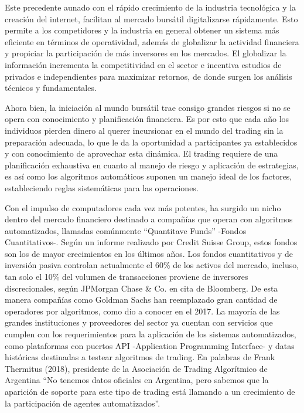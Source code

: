 \documentclass[a4paper,12pt]{Latex/Classes/PhDthesisPSnPDF}
\begin{document}
Este precedente aunado con el rápido crecimiento de la industria tecnológica y la creación del internet, facilitan al mercado bursátil digitalizarse rápidamente. Esto permite a los competidores y la industria en general obtener un sistema más eficiente en términos de operatividad, además de globalizar la actividad financiera y propiciar la participación de más inversores en los mercados. El globalizar la información incrementa la competitividad en el sector e incentiva estudios de privados e independientes para maximizar retornos, de donde surgen los análisis técnicos y fundamentales.

Ahora bien, la iniciación al mundo bursátil trae consigo grandes riesgos si no se opera con conocimiento y planificación financiera. Es por esto que cada año los individuos pierden dinero al querer incursionar en el mundo del trading sin la preparación adecuada, lo que le da la oportunidad a participantes ya establecidos y con conocimiento de aprovechar esta dinámica. El trading requiere de una planificación exhaustiva en cuanto al manejo de riesgo y aplicación de estrategias, es así como los algoritmos automáticos suponen un manejo ideal de los factores, estableciendo reglas sistemáticas para las operaciones.

Con el impulso de computadores cada vez más potentes, ha surgido un nicho dentro del mercado financiero destinado a compañías que operan con algoritmos automatizados, llamadas comúnmente “Quantitave Funds” -Fondos Cuantitativos-. Según un informe realizado por Credit Suisse Group, estos fondos son los de mayor crecimientos en los últimos años. Los fondos cuantitativos y de inversión pasiva controlan actualmente el 60\% de los activos del mercado, incluso, tan solo el 10\% del volumen de transacciones proviene de inversores discrecionales, según JPMorgan Chase \& Co. en cita de Bloomberg. De esta manera compañías como Goldman Sachs han reemplazado gran cantidad de operadores por algoritmos, como dio a conocer en el 2017. La mayoría de las grandes instituciones y proveedores del sector ya cuentan con servicios que cumplen con los requerimientos para la aplicación de los sistemas automatizados, como plataformas con puertos API -Application Programming Interface- y datas históricas destinadas a testear algoritmos de trading. En palabras de Frank Thermitus (2018), presidente de la Asociación de Trading Algorítmico de Argentina “No tenemos datos oficiales en Argentina, pero sabemos que la aparición de soporte para este tipo de trading está llamando a un crecimiento de la participación de agentes automatizados”.
\end{document}
